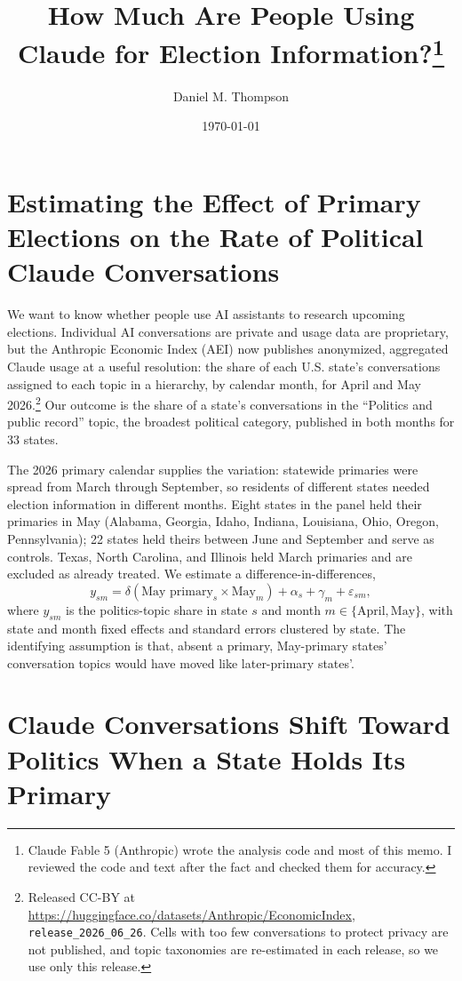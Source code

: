 \documentclass[12pt]{article}
\title{How Much Are People Using Claude for Election Information?\thanks{Claude Fable 5 (Anthropic) wrote the analysis code and most of this memo. I reviewed the code and text after the fact and checked them for accuracy.}}
\author{Daniel M. Thompson}
\date{\today}
\begin{document}
\maketitle

\onehalfspacing

\section*{Estimating the Effect of Primary Elections on the Rate of Political Claude Conversations}

We want to know whether people use AI assistants to research upcoming elections. Individual AI conversations are private and usage data are proprietary, but the Anthropic Economic Index (AEI) now publishes anonymized, aggregated Claude usage at a useful resolution: the share of each U.S. state's conversations assigned to each topic in a hierarchy, by calendar month, for April and May 2026.\footnote{Released CC-BY at \url{https://huggingface.co/datasets/Anthropic/EconomicIndex}, \texttt{release\_2026\_06\_26}. Cells with too few conversations to protect privacy are not published, and topic taxonomies are re-estimated in each release, so we use only this release.} Our outcome is the share of a state's conversations in the ``Politics and public record'' topic, the broadest political category, published in both months for 33 states.

The 2026 primary calendar supplies the variation: statewide primaries were spread from March through September, so residents of different states needed election information in different months. Eight states in the panel held their primaries in May (Alabama, Georgia, Idaho, Indiana, Louisiana, Ohio, Oregon, Pennsylvania); 22 states held theirs between June and September and serve as controls. Texas, North Carolina, and Illinois held March primaries and are excluded as already treated. We estimate a difference-in-differences,
\begin{equation}
y_{sm} = \delta \left(\text{May primary}_s \times \text{May}_m\right) + \alpha_s + \gamma_m + \varepsilon_{sm},
\end{equation}
where $y_{sm}$ is the politics-topic share in state $s$ and month $m \in \{\text{April}, \text{May}\}$, with state and month fixed effects and standard errors clustered by state. The identifying assumption is that, absent a primary, May-primary states' conversation topics would have moved like later-primary states'.

\section*{Claude Conversations Shift Toward Politics When a State Holds Its Primary}
\end{document}
